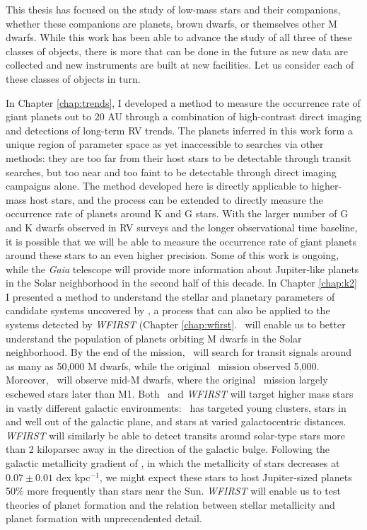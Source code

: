 This thesis has focused on the study of low-mass stars and their companions,
whether these companions are planets, brown dwarfs, or themselves other M dwarfs.
While this work has been able to advance the study of all three of these classes of
objects, there is more that can be done in the future as new data are collected and new
instruments are built at new facilities.
Let us consider each of these classes of objects in turn.

In Chapter \ref{chap:trends}, I developed a method to measure the occurrence rate of giant
planets out to 20 AU through a combination of high-contrast direct imaging and 
detections of long-term RV trends.
The planets inferred in this work form a unique region of parameter space as yet 
inaccessible to searches via other methods:
they are too far from their host stars to be detectable through transit searches,
but too near and too faint to be detectable through direct imaging campaigns alone.
The method developed here is directly applicable to higher-mass host stars, and the
process can be extended to directly measure the occurrence rate of planets around K and G
stars.
With the larger number of G and K dwarfs observed in RV surveys and the longer observational
time baseline, it is possible that we will be able to measure the occurrence rate of 
giant planets around these stars to an even higher precision.
Some of this work is ongoing, while the \textit{Gaia} telescope will provide more  information about Jupiter-like planets in the Solar neighborhood in the second half of
this decade.
In Chapter \ref{chap:k2} I presented a method to understand the stellar and planetary parameters of candidate systems uncovered by \KT, a process that can also be applied to the systems detected by \textit{WFIRST} (Chapter \ref{chap:wfirst}. 
\KT\ will enable us to better understand the population of planets orbiting M dwarfs 
in the Solar neighborhood. 
By the end of the mission, \KT\ will search for transit signals
around as many as 50,000 M dwarfs, while the original \kep\ mission observed 5,000.
Moreover, \KT\ will observe mid-M dwarfs, where the original \kep\ mission largely eschewed
stars later than M1.
Both \KT\ and \textit{WFIRST} will target higher mass stars in vastly different galactic
environments: \KT\ has targeted young clusters, stars in and well out of the galactic 
plane, and stars at varied galactocentric distances.
\textit{WFIRST} will similarly be able to detect transits around solar-type stars
more than 2 kiloparsec away in the direction of the galactic bulge. 
Following the galactic metallicity gradient of \citep{Rolleston00}, in which the 
metallicity of stars decreases at $0.07 \pm 0.01$ dex kpc$^{-1}$, we might expect
these stars to host Jupiter-sized planets 50\% more frequently than stars
near the Sun.
\textit{WFIRST} will enable us to test theories of planet formation and the relation
between stellar metallicity and planet formation with unprecendented detail.

